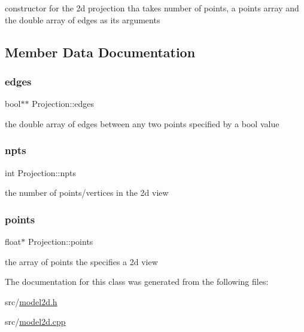 constructor for the 2d projection tha takes number of points, a points array and the double array of edges as its arguments 



\subsection{Member Data Documentation}
\mbox{\label{class_projection_a7943c696e88d15825dee0641b269b5f7}} 
\subsubsection{\texorpdfstring{edges}{edges}}
{\footnotesize\ttfamily bool$\ast$$\ast$ Projection\+::edges}



the double array of edges between any two points specified by a bool value 

\mbox{\label{class_projection_a6972ab0bc1cfa26a5480a940d66e3497}} 
\subsubsection{\texorpdfstring{npts}{npts}}
{\footnotesize\ttfamily int Projection\+::npts}



the number of points/vertices in the 2d view 

\mbox{\label{class_projection_aa42ba5494690dbfa5f875472adc97789}} 
\subsubsection{\texorpdfstring{points}{points}}
{\footnotesize\ttfamily float$\ast$ Projection\+::points}



the array of points the specifies a 2d view 



The documentation for this class was generated from the following files\+:\begin{DoxyCompactItemize}
\item 
src/\mbox{\hyperlink{model2d_8h}{model2d.\+h}}\item 
src/\mbox{\hyperlink{model2d_8cpp}{model2d.\+cpp}}\end{DoxyCompactItemize}
